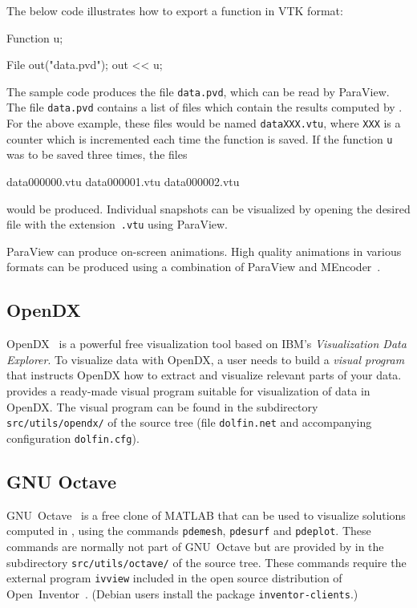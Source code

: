 The below code illustrates how to export a function in VTK format:
\begin{code}
Function u;

File out("data.pvd");
out << u;
\end{code}
The sample code produces the file \texttt{data.pvd}, which can be read 
by ParaView. The file \texttt{data.pvd} contains a list of files which 
contain the results computed by \dolfin{}. For the above example, these 
files would be named \texttt{dataXXX.vtu}, where \texttt{XXX} is a counter 
which is incremented each time the function is saved. If the function 
\texttt{u} was to be saved three times, the files
\begin{code}
data000000.vtu
data000001.vtu
data000002.vtu
\end{code}
would be produced. Individual snapshots can be visualized by opening the 
desired file with the extension~\texttt{.vtu} using ParaView.

ParaView can produce on-screen animations. High quality animations 
in various formats can be produced using a combination of ParaView and 
MEncoder~\cite{www:MEncoder}.


\subsection{OpenDX}

OpenDX~\cite{www:OpenDX} is a powerful free visualization tool based
on IBM's \emph{Visualization Data Explorer}. To visualize data with
OpenDX, a user needs to build a \emph{visual program} that instructs
OpenDX how to extract and visualize relevant parts of your
data. \dolfin{} provides a ready-made visual program suitable for
visualization of \dolfin{} data in OpenDX. The visual program can be
found in the subdirectory \texttt{src/utils/opendx/} of the \dolfin{}
source tree (file \texttt{dolfin.net} and accompanying configuration
\texttt{dolfin.cfg}).

\subsection{GNU Octave}

GNU~Octave~\cite{www:Octave} is a free clone of MATLAB that can be
used to visualize solutions computed in \dolfin{}, using the commands
\texttt{pdemesh}, \texttt{pdesurf} and \texttt{pdeplot}. These
commands are normally not part of GNU~Octave but are
provided by \dolfin{} in the subdirectory \texttt{src/utils/octave/} of
the \dolfin{} source tree. These commands require the external program
\texttt{ivview} included in the open source distribution of
Open~Inventor~\cite{www:OpenInventor}. (Debian users install the
package \texttt{inventor-clients}.)

